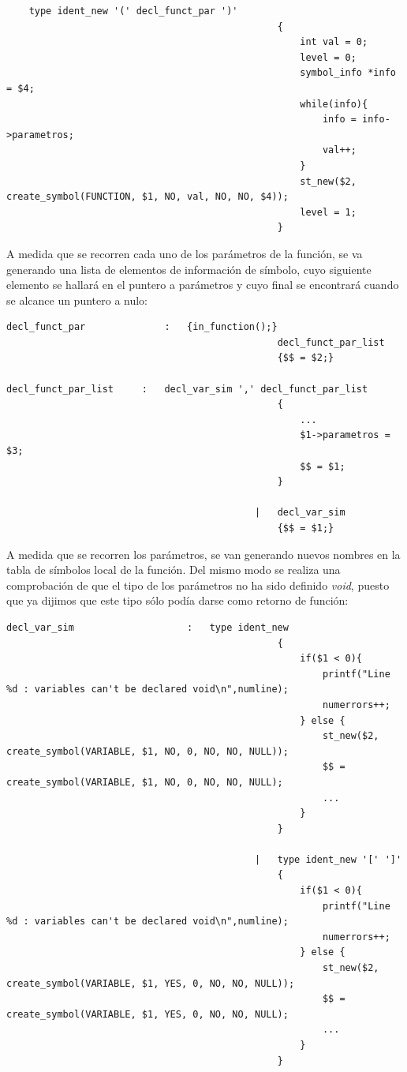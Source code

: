 \documentclass[a4paper,10pt]{article}
\begin{document}
\begin{lstlisting}
	type ident_new '(' decl_funct_par ')' 
												{
													int val = 0;
													level = 0; 
													symbol_info *info = $4;
													while(info){
														info = info->parametros;
														val++;
													}
													st_new($2, create_symbol(FUNCTION, $1, NO, val, NO, NO, $4)); 
													level = 1;
												} 
\end{lstlisting}

A medida que se recorren cada uno de los parámetros de la función, se va generando una lista de elementos de información de símbolo, cuyo siguiente elemento se hallará en el puntero a parámetros y cuyo final se encontrará cuando se alcance un puntero a nulo:

\begin{lstlisting}
decl_funct_par				:	{in_function();} 
												decl_funct_par_list
												{$$ = $2;}

decl_funct_par_list		:	decl_var_sim ',' decl_funct_par_list
												{
													...
													$1->parametros = $3;
													$$ = $1;
												}
												
											|	decl_var_sim
												{$$ = $1;}
\end{lstlisting}

A medida que se recorren los parámetros, se van generando nuevos nombres en la tabla de símbolos local de la función. Del mismo modo se realiza una comprobación de que el tipo de los parámetros no ha sido definido \textit{void}, puesto que ya dijimos que este tipo sólo podía darse como retorno de función:
\begin{lstlisting}
decl_var_sim					:	type ident_new 
												{
													if($1 < 0){
														printf("Line %d : variables can't be declared void\n",numline);
														numerrors++;
													} else {
														st_new($2, create_symbol(VARIABLE, $1, NO, 0, NO, NO, NULL));
														$$ = create_symbol(VARIABLE, $1, NO, 0, NO, NO, NULL);
														...
													}
												}
												
											|	type ident_new '[' ']' 
												{
													if($1 < 0){
														printf("Line %d : variables can't be declared void\n",numline);
														numerrors++;
													} else {
														st_new($2, create_symbol(VARIABLE, $1, YES, 0, NO, NO, NULL));
														$$ = create_symbol(VARIABLE, $1, YES, 0, NO, NO, NULL);
														...
													}
												}
												
\end{lstlisting}
\end{document}
